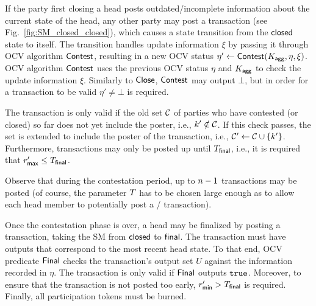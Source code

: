 


 If the party first closing a head posts
outdated/incomplete information about the current state of the head,
any other party may post a \mtxContest{} transaction (see
Fig.~\ref{fig:SM_closed_closed}), which causes a state transition from
the $\mathsf{closed}$ state to itself.  The transition handles update
information $\xi$ by passing it through OCV algorithm $\mathsf{Contest}$,
resulting in a new OCV status
$\eta' \gets \mathsf{Contest} (K_{\mathsf{agg}},\eta,\xi)$.  OCV algorithm
$\mathsf{Contest}$ uses the previous OCV status $\eta$ and $K_{\mathsf{agg}}$ to check
the update information $\xi$.  Similarly to $\mathsf{Close}$, $\mathsf{Contest}$
may output $\bot$, but in order for a \mtxContest{} transaction to be
valid $\eta' \neq \bot$ is required.

The \mtxContest{} transaction is only valid if the old set
$\mathcal C$ of parties who have contested (or closed) so far does not yet
include the poster, i.e., $k' \notin \mathcal C$.  If this check
passes, the set is extended to include the poster of the \mtxContest{}
transaction, i.e., $\mathcal C' \gets \mathcal C \cup \{k'\}$.
Furthermore, \mtxContest{} transactions may only be posted up until
$T_{\mathsf{final}}$, i.e., it is required that $r_{\mathsf{max}}' \leq T_{\mathsf{final}}$.

Observe that during the contestation period, up to $n-1$
\mtxContest{} transactions may be posted (of course, the parameter
$T$ has to be chosen large enough as to allow each head member to
potentially post a \mtxClose{}/\mtxContest{} transaction).






  Once the contestation phase is over, a head
may be finalized by posting a \mtxFanout{} transaction, taking the SM
from $\mathsf{closed}$ to $\mathsf{final}$.  The \mtxFanout{} transaction must
have outputs that correspond to the most recent head state.  To that
end, OCV predicate $\mathsf{Final}$ checks the transaction's output set $U$
against the information recorded in $\eta$.  The \mtxFanout{}
transaction is only valid if $\mathsf{Final}$ outputs $\mathtt{true}$.  Moreover,
to ensure that the \mtxFanout{} transaction is not posted too early,
$r_{\mathsf{min}}' > T_{\mathsf{final}}$ is required.  Finally, all participation tokens
must be burned.


